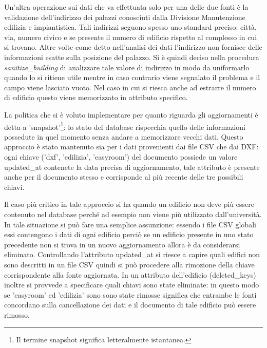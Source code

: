 \documentclass[12pt]{report}
\begin{document}
Un'altra operazione sui dati che va effettuata solo per una delle due fonti è la validazione dell'indirizzo dei palazzi conosciuti dalla Divisione Manutenzione edilizia e impiantistica.
Tali indirizzi seguono spesso uno standard preciso: città, via, numero civico e se presente il numero di edificio rispetto al complesso in cui si trovano. 
Altre volte come detto nell'analisi dei dati l'indirizzo non fornisce delle informazioni esatte sulla posizione del palazzo.
Si è quindi deciso nella procedura \textit{sanitize\_building} di analizzare tale valore di indirizzo in modo da uniformarlo quando lo si ritiene utile mentre in caso contrario viene segnalato il problema e il campo viene lasciato vuoto.
Nel caso in cui si riesca anche ad estrarre il numero di edificio questo viene memorizzato in attributo specifico.
 
\vspace{5mm} %

La politica che si è voluto implementare per quanto riguarda gli aggiornamenti è detta a 'snapshot'\footnote{Il termine snapshot significa letteralmente istantanea.}: lo stato del database rispecchia quello delle informazioni possedute in quel momento senza andare a memorizzare vecchi dati.
Questo approccio è stato mantenuto sia per i dati provenienti dai file CSV che dai DXF: ogni chiave ('dxf', 'edilizia', 'easyroom') del documento possiede un valore updated\_at contenete la data precisa di aggiornamento, tale attributo è presente anche per il documento stesso e corrisponde al più recente delle tre possibili chiavi.

Il caso più critico in tale approccio si ha quando un edificio non deve più essere contenuto nel database perché ad esempio non viene più utilizzato dall'università.
In tale situazione si può fare una semplice assunzione: essendo i file CSV globali essi contengono i dati di ogni edificio perciò se un edificio presente in uno stato precedente non si trova in un nuovo aggiornamento allora è da considerarsi eliminato.
Controllando l'attributo updated\_at si riesce a capire quali edifici non sono descritti in un file CSV quindi si può procedere alla rimozione della chiave corrispondente alla fonte aggiornata.
In un attributo dell'edificio (deleted\_keys) inoltre si provvede a specificare quali chiavi sono state eliminate: in questo modo se 'easyroom' ed 'edilizia' sono sono state rimosse significa che entrambe le fonti concordano sulla cancellazione dei dati e il documento di tale edificio può essere rimosso.
\end{document}
